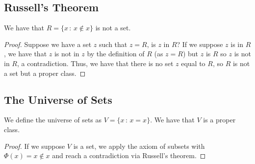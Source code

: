 \subsection{Russell's Theorem}

We have that $R = \{x \, : \, x \notin x\}$ is not a set.
\begin{proof}
    Suppose we have a set $z$ such that $z = R$, is $z$ in $R$?
    If we suppose $z$ is in $R$, we have that $z$ is not in $z$ by the definition
    of $R$ (as $z = R$) but $z$ is $R$ so $z$ is not in $R$, a contradiction.
    Thus, we have that there is no set $z$ equal to $R$, so $R$ is not a set
    but a proper class.
\end{proof}

\subsection{The Universe of Sets}

We define the universe of sets as $V = \{x \, : \, x = x\}$.
We have that $V$ is a proper class.
\begin{proof}
    If we suppose $V$ is a set, we apply the axiom of subsets with
    $\Phi(x) = x \notin x$ and reach a contradiction via Russell's
    theorem.
\end{proof}

